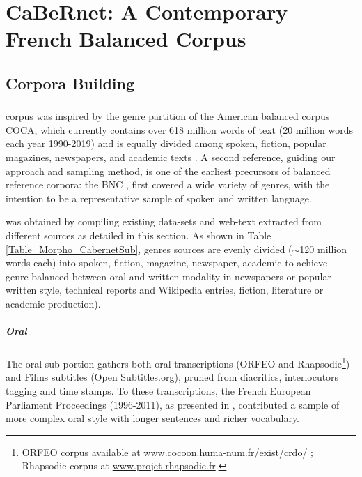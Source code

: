 \chapter{CaBeRnet: A Contemporary French Balanced Corpus}


\section{Corpora Building}%
\label{sec:DescribeCorpora}

\subsection{\Cabernet} \label{subsec:DescribeCaBeRnet}

\Cabernet corpus was inspired by the genre partition of the American balanced corpus COCA, %
which currently contains over 618 million words of text (20 million words each year 1990-2019) and is equally divided among spoken, fiction, popular magazines, newspapers, and academic texts \citep{davies-2009-the, davies-2010-the}. A second reference, guiding our approach and sampling method, is one of the earliest precursors of balanced reference corpora: the BNC \citep{bnc-2007-the}, first covered a wide variety of genres, with the intention to be a representative sample of spoken and written language.

\Cabernet was obtained by compiling existing data-sets and web-text extracted from different sources as detailed in this section. As shown in Table \ref{Table_Morpho_CabernetSub}, genres sources are evenly divided ($\sim$120 million words each) into spoken, fiction, magazine, newspaper, academic to achieve genre-balanced between oral and written modality in newspapers or popular written style, technical reports and Wikipedia entries, fiction, literature or academic production).

\paragraph{\Cabernet Oral} \label{subsec:DescribeCaBeRnetOral}
The oral sub-portion gathers both oral transcriptions (\textsc{ORFEO} and Rhapsodie\footnote{\textsc{ORFEO} corpus available at \url{www.cocoon.huma-num.fr/exist/crdo/} ; Rhapsodie corpus at \url{www.projet-rhapsodie.fr}.}) and Films subtitles (Open Subtitles.org), pruned from diacritics, interlocutors tagging and time stamps. To these transcriptions, the French European Parliament Proceedings (1996-2011), as presented in \citet{koehn-2005-europarl}, contributed a sample of more complex oral style with longer sentences and richer vocabulary.%

